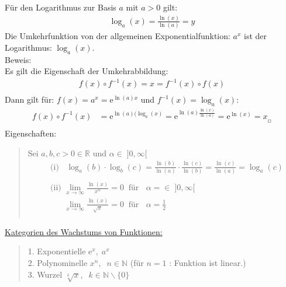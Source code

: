 Für den Logarithmus zur Basis $ a $ mit $ a>0 $ gilt:\\
\begin{align*}
\log_a(x)=\frac{\ln(x)}{\ln(a)}=y
\end{align*}
Die Umkehrfunktion von der allgemeinen Exponentialfunktion: $ a^x $ ist der Logarithmus: $\log_a(x) $.\\
Beweis:\\
Es gilt die Eigenschaft der Umkehrabbildung:\\
\begin{align*}
f(x)\circ f^{-1}(x)=x=f^{-1}(x)\circ f(x)\\
\end{align*}
Dann gilt für: $ f(x)=a^x=\mathrm{e}^{\ln(a)x}$  und $f^{-1}(x)=\log_a(x) $:\\
\begin{align*}
f(x)\circ f^{-1}(x)&=\mathrm{e}^{\ln(a)(\log_a(x)}=\mathrm{e}^{\ln(a)\frac{\ln(x)}{\ln(a)}}=\mathrm{e}^{\ln(x)}=x_{_{\Square}}\\
\end{align*}
Eigenschaften:\\
\begin{quote}
	Sei $ a,b,c>0\in \mathbb{R}  $ und $ \alpha\in\;]0,\infty[ $\\
	\begin{align*}
	&\text{(i) }\;\;\log_a(b)\cdot \log_b(c)=\frac{\ln(b)}{\ln(a)}\cdot\frac{\ln(c)}{\ln(b)}=\frac{\ln(c)}{\ln(a)}=\log_a(c)\\
	\\
	&\text{(ii) }\lim\limits_ {x\to\infty}\frac{\ln(x)}{x^\alpha}=0 \;\;\text{für }\;\;\alpha=\in\;]0,\infty[\\
	&\;\;\;\;\;\;\lim\limits_ {x\to\infty}\frac{\ln(x)}{\sqrt{x}}=0\;\;\text{für }\;\;\alpha=\frac{1}{2}\\
	\end{align*}
\end{quote}
\underline{Kategorien des Wachstums von Funktionen:}\\
\begin{quote}
	1. Exponentielle $ \mathrm{e}^x,\; a^x $\\
	2. Polynominelle $ x^n,\;\; n\in\mathbb{N} $ (für $ n=1  $ : Funktion ist linear.)\\
	3. Wurzel $ \sqrt[k]{x},\;\; k\in\mathbb{N}\backslash \{0\} $
\end{quote}
